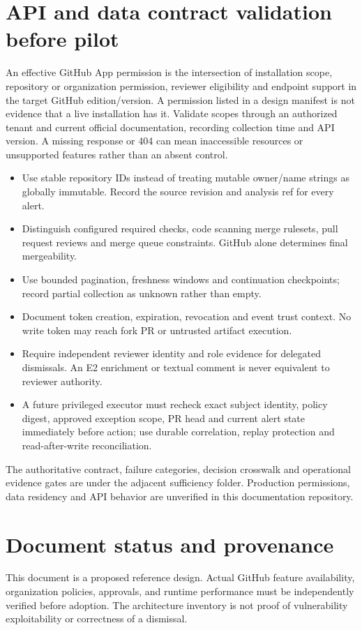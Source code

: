 \documentclass[11pt,letterpaper]{article}
\begin{document}
\section{API and data contract validation before pilot}
An effective GitHub App permission is the intersection of installation scope, repository or organization permission, reviewer eligibility and endpoint support in the target GitHub edition/version. A permission listed in a design manifest is not evidence that a live installation has it. Validate scopes through an authorized tenant and current official documentation, recording collection time and API version. A missing response or 404 can mean inaccessible resources or unsupported features rather than an absent control.

\begin{itemize}
\item Use stable repository IDs instead of treating mutable owner/name strings as globally immutable. Record the source revision and analysis ref for every alert.
\item Distinguish configured required checks, code scanning merge rulesets, pull request reviews and merge queue constraints. GitHub alone determines final mergeability.
\item Use bounded pagination, freshness windows and continuation checkpoints; record partial collection as unknown rather than empty.
\item Document token creation, expiration, revocation and event trust context. No write token may reach fork PR or untrusted artifact execution.
\item Require independent reviewer identity and role evidence for delegated dismissals. An E2 enrichment or textual comment is never equivalent to reviewer authority.
\item A future privileged executor must recheck exact subject identity, policy digest, approved exception scope, PR head and current alert state immediately before action; use durable correlation, replay protection and read-after-write reconciliation.
\end{itemize}

The authoritative contract, failure categories, decision crosswalk and operational evidence gates are under the adjacent sufficiency folder. Production permissions, data residency and API behavior are unverified in this documentation repository.

\section*{Document status and provenance}
This document is a proposed reference design. Actual GitHub feature availability, organization policies, approvals, and runtime performance must be independently verified before adoption. The architecture inventory is not proof of vulnerability exploitability or correctness of a dismissal.
\end{document}
